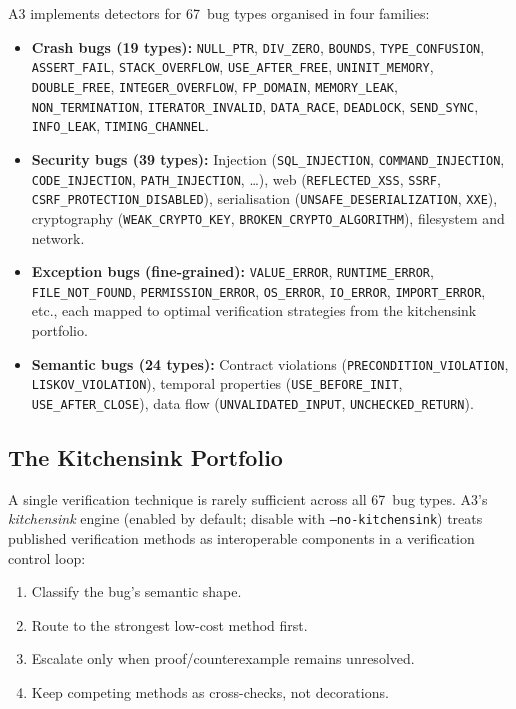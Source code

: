 \documentclass[sigconf,review,anonymous]{acmart}
\begin{document}
\textsc{A3} implements detectors for 67~bug types organised in four families:

\begin{itemize}
  \item \textbf{Crash bugs (19 types):} \texttt{NULL\_PTR}, \texttt{DIV\_ZERO}, \texttt{BOUNDS}, \texttt{TYPE\_CONFUSION}, \texttt{ASSERT\_FAIL}, \texttt{STACK\_OVERFLOW}, \texttt{USE\_AFTER\_FREE}, \texttt{UNINIT\_MEMORY}, \texttt{DOUBLE\_FREE}, \texttt{INTEGER\_OVERFLOW}, \texttt{FP\_DOMAIN}, \texttt{MEMORY\_LEAK}, \texttt{NON\_TERMINATION}, \texttt{ITERATOR\_INVALID}, \texttt{DATA\_RACE}, \texttt{DEADLOCK}, \texttt{SEND\_SYNC}, \texttt{INFO\_LEAK}, \texttt{TIMING\_CHANNEL}.
  \item \textbf{Security bugs (39 types):} Injection (\texttt{SQL\_INJECTION}, \texttt{COMMAND\_INJECTION}, \texttt{CODE\_INJECTION}, \texttt{PATH\_INJECTION}, \ldots), web (\texttt{REFLECTED\_XSS}, \texttt{SSRF}, \texttt{CSRF\_PROTECTION\_DISABLED}), serialisation (\texttt{UNSAFE\_DESERIALIZATION}, \texttt{XXE}), cryptography (\texttt{WEAK\_CRYPTO\_KEY}, \texttt{BROKEN\_CRYPTO\_ALGORITHM}), filesystem and network.
  \item \textbf{Exception bugs (fine-grained):} \texttt{VALUE\_ERROR}, \texttt{RUNTIME\_ERROR}, \texttt{FILE\_NOT\_FOUND}, \texttt{PERMISSION\_ERROR}, \texttt{OS\_ERROR}, \texttt{IO\_ERROR}, \texttt{IMPORT\_ERROR}, etc., each mapped to optimal verification strategies from the kitchensink portfolio.
  \item \textbf{Semantic bugs (24 types):} Contract violations (\texttt{PRECONDITION\_VIOLATION}, \texttt{LISKOV\_VIOLATION}), temporal properties (\texttt{USE\_BEFORE\_INIT}, \texttt{USE\_AFTER\_CLOSE}), data flow (\texttt{UNVALIDATED\_INPUT}, \texttt{UNCHECKED\_RETURN}).
\end{itemize}

\subsection{The Kitchensink Portfolio}

A single verification technique is rarely sufficient across all 67~bug types.
\textsc{A3}'s \emph{kitchensink} engine (enabled by default; disable with \texttt{--no-kitchensink}) treats published verification methods as interoperable components in a verification control loop:

\begin{enumerate}
  \item Classify the bug's semantic shape.
  \item Route to the strongest low-cost method first.
  \item Escalate only when proof/counterexample remains unresolved.
  \item Keep competing methods as cross-checks, not decorations.
\end{enumerate}
\end{document}
